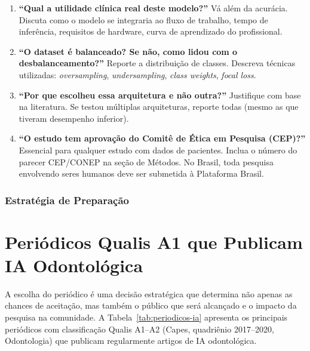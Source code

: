 \begin{enumerate}
  \item \textbf{``Qual a utilidade clínica real deste modelo?''}
    Vá além da acurácia. Discuta como o modelo se integraria ao fluxo de
    trabalho, tempo de inferência, requisitos de hardware, curva de aprendizado
    do profissional.

  \item \textbf{``O dataset é balanceado? Se não, como lidou com o
    desbalanceamento?''}
    Reporte a distribuição de classes. Descreva técnicas utilizadas:
    \textit{oversampling}, \textit{undersampling}, \textit{class weights},
    \textit{focal loss}.

  \item \textbf{``Por que escolheu essa arquitetura e não outra?''}
    Justifique com base na literatura. Se testou múltiplas arquiteturas, reporte
    todas (mesmo as que tiveram desempenho inferior).

  \item \textbf{``O estudo tem aprovação do Comitê de Ética em Pesquisa (CEP)?''}
    Essencial para qualquer estudo com dados de pacientes. Inclua o número do
    parecer CEP/CONEP na seção de Métodos. No Brasil, toda pesquisa envolvendo
    seres humanos deve ser submetida à Plataforma Brasil.
\end{enumerate}

\subsubsection{Estratégia de Preparação}


\section{Periódicos Qualis A1 que Publicam IA Odontológica}
\label{sec:periodicos-qualis}

\nivelquatro

A escolha do periódico é uma decisão estratégica que determina não apenas as
chances de aceitação, mas também o público que será alcançado e o impacto da
pesquisa na comunidade. A Tabela~\ref{tab:periodicos-ia} apresenta os principais
periódicos com classificação Qualis A1--A2 (Capes, quadriênio 2017--2020,
Odontologia) que publicam regularmente artigos de IA odontológica.

